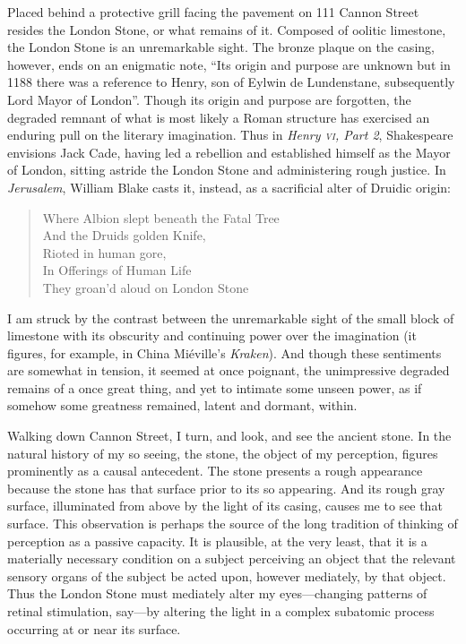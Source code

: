 \documentclass[12pt]{article}
\begin{document}
Placed behind a protective grill facing the pavement on 111 Cannon Street resides the London Stone, or what remains of it. Composed of oolitic limestone, the London Stone is an unremarkable sight. The bronze plaque on the casing, however, ends on an enigmatic note, ``Its origin and purpose are unknown but in 1188 there was a reference to Henry, son of Eylwin de Lundenstane, subsequently Lord Mayor of London''. Though its origin and purpose are forgotten, the degraded remnant of what is most likely a Roman structure has exercised an enduring pull on the literary imagination. Thus in \emph{Henry \textsc{vi}, Part 2}, Shakespeare envisions Jack Cade, having led a rebellion and established himself as the Mayor of London, sitting astride the London Stone and administering rough justice. In \emph{Jerusalem}, William Blake casts it, instead, as a sacrificial alter of Druidic origin:
\begin{verse}
Where Albion slept beneath the Fatal Tree\\
And the Druids golden Knife,\\
Rioted in human gore,\\
In Offerings of Human Life\\
They groan'd aloud on London Stone
\end{verse}
I am struck by the contrast between the unremarkable sight of the small block of limestone with its obscurity and continuing power over the imagination (it figures, for example, in China Miéville's \emph{Kraken}). And though these sentiments are somewhat in tension, it seemed at once poignant, the unimpressive degraded remains of a once great thing, and yet to intimate some unseen power, as if somehow some greatness remained, latent and dormant, within.

Walking down Cannon Street, I turn, and look, and see the ancient stone. In the natural history of my so seeing, the stone, the object of my perception, figures prominently as a causal antecedent. The stone presents a rough appearance because the stone has that surface prior to its so appearing. And its rough gray surface, illuminated from above by the light of its casing, causes me to see that surface. This observation is perhaps the source of the long tradition of thinking of perception as a passive capacity. It is plausible, at the very least, that it is a materially necessary condition on a subject perceiving an object that the relevant sensory organs of the subject be acted upon, however mediately, by that object. Thus the London Stone must mediately alter my eyes---changing patterns of retinal stimulation, say---by altering the light in a complex subatomic process occurring at or near its surface.
\end{document}
